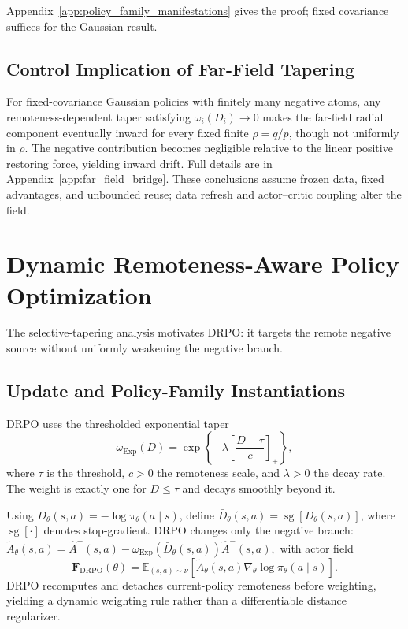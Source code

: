 \documentclass{article}
\theoremstyle{plain}
\theoremstyle{definition}
\theoremstyle{remark}
\begin{document}
Appendix~\ref{app:policy_family_manifestations} gives the proof; fixed
covariance suffices for the Gaussian result.

\subsection{Control Implication of Far-Field Tapering}
\label{sec:selective_tapering_bridge}

For fixed-covariance Gaussian policies with finitely many negative atoms,
any remoteness-dependent taper satisfying \(\omega_i(D_i)\to0\) makes the
far-field radial component eventually inward for every fixed finite
\(\rho=q/p\), though not uniformly in \(\rho\).
The negative contribution becomes negligible relative to the linear positive
restoring force, yielding inward drift.
Full details are in Appendix~\ref{app:far_field_bridge}.
These conclusions assume frozen data, fixed advantages, and unbounded reuse;
data refresh and actor--critic coupling alter the field.

\section{Dynamic Remoteness-Aware Policy Optimization}
\label{sec:drpo}

The selective-tapering analysis motivates DRPO: it targets the remote
negative source without uniformly weakening the negative branch.

\subsection{Update and Policy-Family Instantiations}
\label{subsec:drpo_update}

DRPO uses the thresholded exponential taper
\begin{equation}
    \omega_{\mathrm{Exp}}(D)
    =
    \exp
    \left\{
        -\lambda
        \left[
            \frac{D-\tau}{c}
        \right]_{+}
    \right\},
    \label{eq:drpo_exp_weight}
\end{equation}
where \(\tau\) is the threshold, \(c>0\) the remoteness scale, and
\(\lambda>0\) the decay rate. The weight is exactly one for \(D\leq\tau\) and
decays smoothly beyond it.

Using \(D_\theta(s,a)=-\log\pi_\theta(a\mid s)\), define
\(\bar D_\theta(s,a)=\operatorname{sg}[D_\theta(s,a)]\), where
\(\operatorname{sg}[\cdot]\) denotes stop-gradient. DRPO changes only the
negative branch:
\(
    \widetilde A_{\theta}(s,a)
    =
    \widehat A^{+}(s,a)
    -
    \omega_{\mathrm{Exp}}
    \!\left(\bar D_\theta(s,a)\right)
    \widehat A^{-}(s,a),
\)
with actor field
\begin{equation}
    \mathbf F_{\mathrm{DRPO}}(\theta)
    =
    \mathbb E_{(s,a)\sim\nu}
    \left[
        \widetilde A_{\theta}(s,a)
        \nabla_\theta\log\pi_\theta(a\mid s)
    \right].
    \label{eq:drpo_actor_field}
\end{equation}
DRPO recomputes and detaches current-policy remoteness before weighting,
yielding a dynamic weighting rule rather than a differentiable distance
regularizer.
\end{document}
